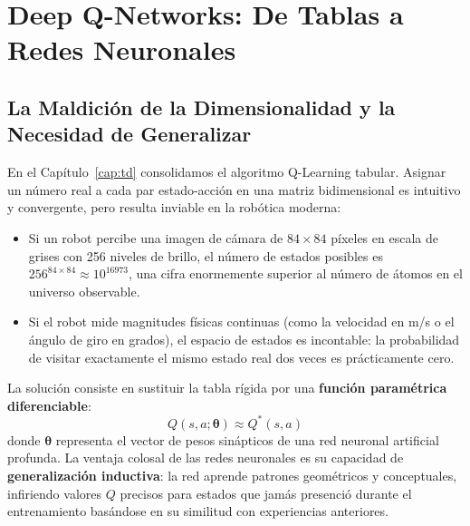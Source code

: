 \chapter{Deep Q-Networks: De Tablas a Redes Neuronales}
\label{cap:dqn}

\section{La Maldición de la Dimensionalidad y la Necesidad de Generalizar}
En el Capítulo~\ref{cap:td} consolidamos el algoritmo Q-Learning tabular. Asignar un número real a cada par estado-acción en una matriz bidimensional es intuitivo y convergente, pero resulta inviable en la robótica moderna:
\begin{itemize}
  \item Si un robot percibe una imagen de cámara de $84 \times 84$ píxeles en escala de grises con 256 niveles de brillo, el número de estados posibles es $256^{84 \times 84} \approx 10^{16973}$, una cifra enormemente superior al número de átomos en el universo observable.
  \item Si el robot mide magnitudes físicas continuas (como la velocidad en m/s o el ángulo de giro en grados), el espacio de estados es incontable: la probabilidad de visitar exactamente el mismo estado real dos veces es prácticamente cero.
\end{itemize}

La solución consiste en sustituir la tabla rígida por una \textbf{función paramétrica diferenciable}:
\begin{equation}
  Q(s, a; \boldsymbol{\theta}) \approx Q^*(s, a)
\end{equation}
donde $\boldsymbol{\theta}$ representa el vector de pesos sinápticos de una red neuronal artificial profunda. La ventaja colosal de las redes neuronales es su capacidad de \textbf{generalización inductiva}: la red aprende patrones geométricos y conceptuales, infiriendo valores $Q$ precisos para estados que jamás presenció durante el entrenamiento basándose en su similitud con experiencias anteriores.

